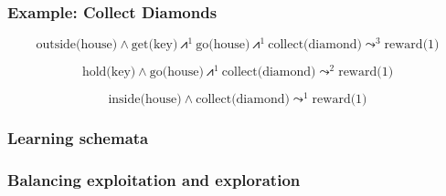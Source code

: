 \documentclass[aspectratio=169]{beamer}
\newcommand{\lpreimp}[1]{\leadsto^{#1}}
\newcommand{\lseqand}[1]{\bigslopedwedge^{#1}}
\begin{document}
\begin{frame}
  \frametitle{Example: Collect Diamonds}



  $$\text{outside(house)} \land \text{get(key)} \lseqand{1}
  \text{go(house)} \lseqand{1} \text{collect(diamond)} \lpreimp{3}
  \text{reward(1)}$$

  \pause


  $$\text{hold(key)} \land \text{go(house)} \lseqand{1} \text{collect(diamond)}
  \lpreimp{2} \text{reward(1)}$$

  \pause


  $$\text{inside(house)} \land \text{collect(diamond)} \lpreimp{1}
  \text{reward(1)}$$
\end{frame}

\begin{frame}
  \frametitle{Learning schemata}
\end{frame}

\begin{frame}
  \frametitle{Balancing exploitation and exploration}
\end{frame}
\end{document}

